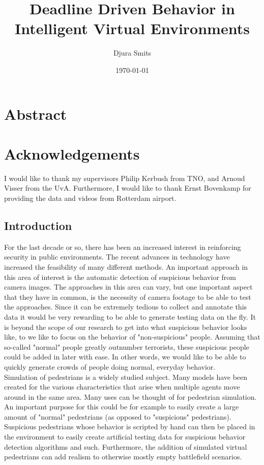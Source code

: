 \documentclass[11pt]{book}
\title{Deadline Driven Behavior in Intelligent Virtual Environments}
\author{ Djura Smits}
\date{\today}
\begin{document}
\listoftodos
\maketitle
 \chapter*{\centering Abstract}
\maketitle
\newpage
 \chapter*{\centering Acknowledgements}
\maketitle
I would like to thank my supervisors Philip Kerbush from TNO, and Arnoud Visser from the UvA. Furthermore, I would like to thank Ernst Bovenkamp for providing the data and videos from Rotterdam airport.
\newpage
\tableofcontents
\newpage

\section{Introduction}
For the last decade or so, there has been an increased interest in reinforcing security in public environments. The recent advances in technology have increased the feasibility of many different methods. An important approach in this area of interest is the automatic detection of suspicious behavior from camera images. The approaches in this area can vary, but one important aspect that they have in common, is the necessity of camera footage to be able to test the approaches. Since it can be extremely tedious to collect and annotate this data it would be very rewarding to be able to generate testing data on the fly. It is beyond the scope of our research to get into what suspicious behavior looks like, to we like to focus on the behavior of "non-suspicious" people. Assuming that so-called "normal" people greatly outnumber terrorists, these suspicious people could be added in later with ease. In other words, we would like to be able to quickly generate crowds of people doing normal, everyday behavior.\\
Simulation of pedestrians is a widely studied subject. Many models have been created for the various characteristics that arise when multiple agents move around in the same area. Many uses can be thought of for pedestrian simulation. An important purpose for this could be for example to easily create a large amount of "normal" pedestrians (as opposed to "suspicious" pedestrians).  Suspicious pedestrians whose behavior is scripted by hand can then be placed in the environment to easily create artificial testing data for suspicious behavior detection algorithms and such. Furthermore, the addition of simulated virtual pedestrians can add realism to otherwise mostly empty battlefield scenarios.
\end{document}
